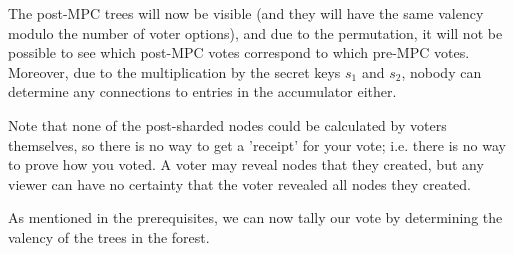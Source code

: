 \documentclass{article}
\begin{document}
The post-MPC trees will now be visible (and they will have the same valency modulo the number of voter options), and due to the permutation, it will not be possible to see which post-MPC votes correspond to which pre-MPC votes. Moreover, due to the multiplication by the secret keys $s_1$ and $s_2$, nobody can determine any connections to entries in the accumulator either.

Note that none of the post-sharded nodes could be calculated by voters themselves, so there is no way to get a 'receipt' for your vote; i.e. there is no way to prove how you voted. A voter may reveal nodes that they created, but any viewer can have no certainty that the voter revealed all nodes they created.

As mentioned in the prerequisites, we can now tally our vote by determining the valency of the trees in the forest.
\end{document}
